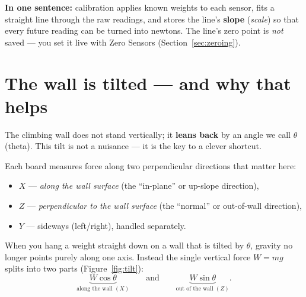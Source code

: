 \documentclass[11pt,a4paper]{article}
\begin{document}
\begin{infobox}
\textbf{In one sentence:} calibration applies known weights to each sensor, fits a
straight line through the raw readings, and stores the line's \textbf{slope}
(\emph{scale}) so that every future reading can be turned into newtons. The line's
zero point is \emph{not} saved --- you set it live with \textsf{Zero Sensors}
(Section~\ref{sec:zeroing}).
\end{infobox}

\section{The wall is tilted --- and why that helps}

The climbing wall does not stand vertically; it \textbf{leans back} by an angle we
call $\theta$ (theta). This tilt is not a nuisance --- it is the key to a clever
shortcut.

Each board measures force along two perpendicular directions that matter here:
\begin{itemize}[leftmargin=1.4em]
  \item $X$ --- \emph{along the wall surface} (the ``in-plane'' or up-slope
        direction),
  \item $Z$ --- \emph{perpendicular to the wall surface} (the ``normal'' or
        out-of-wall direction),
  \item $Y$ --- sideways (left/right), handled separately.
\end{itemize}

When you hang a weight straight down on a wall that is tilted by $\theta$, gravity
no longer points purely along one axis. Instead the single vertical force $W=mg$
splits into two parts (Figure~\ref{fig:tilt}):
\begin{equation}
  \underbrace{W\cos\theta}_{\text{along the wall }(X)} \qquad\text{and}\qquad
  \underbrace{W\sin\theta}_{\text{out of the wall }(Z)} .
\end{equation}
\end{document}
